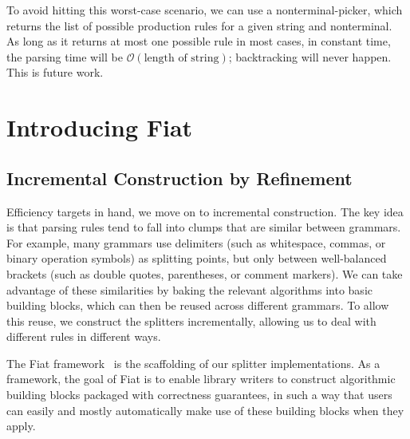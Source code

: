   To avoid hitting this worst-case scenario, we can use a nonterminal-picker, which returns the list of possible production rules for a given string and nonterminal.  As long as it returns at most one possible rule in most cases, in constant time, the parsing time will be $\mathcal O(\text{length of string})$; backtracking will never happen.  This is future work.\label{sec:worst-case}
  
\section{Introducing Fiat}
  \subsection{Incremental Construction by Refinement}
  Efficiency targets in hand, we move on to incremental construction.  The key idea is that parsing rules tend to fall into clumps that are similar between grammars.  For example, many grammars use delimiters (such as whitespace, commas, or binary operation symbols) as splitting points, but only between well-balanced brackets (such as double quotes, parentheses, or comment markers).  We can take advantage of these similarities by baking the relevant algorithms into basic building blocks, which can then be reused across different grammars.  To allow this reuse, we construct the splitters incrementally, allowing us to deal with different rules in different ways.
  
  The Fiat framework~\cite{delaware2015fiat} is the scaffolding of our splitter implementations.  As a framework, the goal of Fiat is to enable library writers to construct algorithmic building blocks packaged with correctness guarantees, in such a way that users can easily and mostly automatically make use of these building blocks when they apply. 
  
